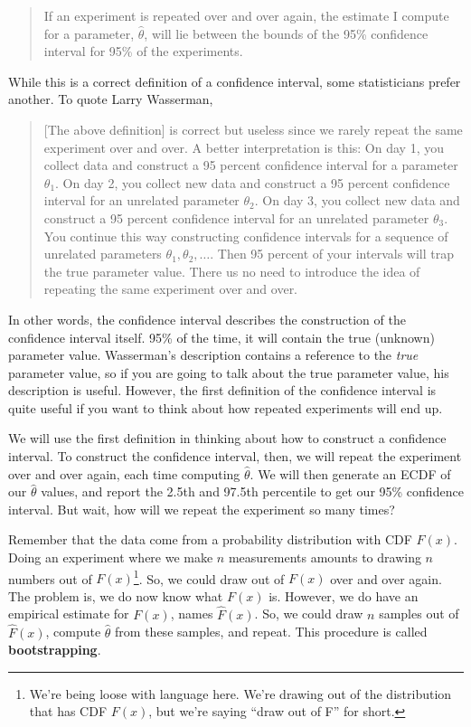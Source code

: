 \begin{quote}
    If an experiment is repeated over and over again, the estimate I compute for a parameter, $\hat{\theta}$, will lie between the bounds of the 95\% confidence interval for 95\% of the experiments.
\end{quote}

While this is a correct definition of a confidence interval, some statisticians prefer another. To quote Larry Wasserman,

\begin{quote}
    [The above definition] is correct but useless since we rarely repeat the same experiment over and over. A better interpretation is this: On day 1, you collect data and construct a 95 percent confidence interval for a parameter $\theta_1$. On day 2, you collect new data and construct a 95 percent confidence interval for an unrelated parameter $\theta_2$. On day 3, you collect new data and construct a 95 percent confidence interval for an unrelated parameter $\theta_3$. You continue this way constructing confidence intervals for a sequence of unrelated parameters $\theta_1, \theta_2, \ldots$. Then 95 percent of your intervals will trap the true parameter value. There us no need to introduce the idea of repeating the same experiment over and over.
\end{quote}

In other words, the confidence interval describes the construction of the confidence interval itself. 95\% of the time, it will contain the true (unknown) parameter value. Wasserman's description contains a reference to the \textit{true} parameter value, so if you are going to talk about the true parameter value, his description is useful. However, the first definition of the confidence interval is quite useful if you want to think about how repeated experiments will end up.

We will use the first definition in thinking about how to construct a confidence interval. To construct the confidence interval, then, we will repeat the experiment over and over again, each time computing $\hat{\theta}$. We will then generate an ECDF of our $\hat{\theta}$ values, and report the 2.5th and 97.5th percentile to get our 95\% confidence interval. But wait, how will we repeat the experiment so many times?

Remember that the data come from a probability distribution with CDF $F(x)$. Doing an experiment where we make $n$ measurements amounts to drawing $n$ numbers out of $F(x)$\footnote{We're being loose with language here. We're drawing out of the distribution that has CDF $F(x)$, but we're saying ``draw out of F'' for short.}. So, we could draw out of $F(x)$ over and over again. The problem is, we do now know what $F(x)$ is. However, we do have an empirical estimate for $F(x)$, names $\hat{F}(x)$. So, we could draw $n$ samples out of $\hat{F}(x)$, compute $\hat{\theta}$ from these samples, and repeat. This procedure is called \textbf{bootstrapping}.

